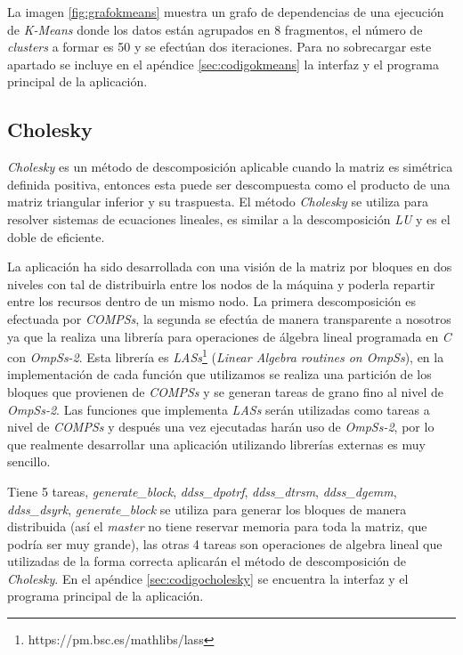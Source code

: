 La imagen \ref{fig:grafokmeans} muestra un grafo de dependencias de una ejecución de \textit{K-Means} donde los datos están agrupados en 8 fragmentos, el número de \textit{clusters} a formar es 50 y se efectúan dos iteraciones. Para no sobrecargar este apartado se incluye en el apéndice \ref{sec:codigokmeans} la interfaz y el programa principal de la aplicación.

\subsection{Cholesky}

\textit{Cholesky} es un método de descomposición aplicable cuando la matriz es simétrica definida positiva, entonces esta puede ser descompuesta como el producto de una matriz triangular inferior y su traspuesta. El método \textit{Cholesky} se utiliza para resolver sistemas de ecuaciones lineales, es similar a la descomposición \textit{LU} y es el doble de eficiente.
\par\bigskip
La aplicación ha sido desarrollada con una visión de la matriz por bloques en dos niveles con tal de distribuirla entre los nodos de la máquina y poderla repartir entre los recursos dentro de un mismo nodo. La primera descomposición es efectuada por \textit{COMPSs}, la segunda se efectúa de manera transparente a nosotros ya que la realiza una librería para operaciones de álgebra lineal programada en \textit{C} con \textit{OmpSs-2}. Esta librería es \textit{LASs}\footnote{https://pm.bsc.es/mathlibs/lass} (\textit{Linear Algebra routines on OmpSs}), en la implementación de cada función que utilizamos se realiza una partición de los bloques que provienen de \textit{COMPSs} y se generan tareas de grano fino al nivel de \textit{OmpSs-2}. Las funciones que implementa \textit{LASs} serán utilizadas como tareas a nivel de \textit{COMPSs} y después una vez ejecutadas harán uso de \textit{OmpSs-2}, por lo que realmente desarrollar una aplicación utilizando librerías externas es muy sencillo.
\par\bigskip
Tiene 5 tareas, \textit{generate\_block}, \textit{ddss\_dpotrf}, \textit{ddss\_dtrsm}, \textit{ddss\_dgemm}, \textit{ddss\_dsyrk}, \textit{generate\_block} se utiliza para generar los bloques de manera distribuida (así el \textit{master} no tiene reservar memoria para toda la matriz, que podría ser muy grande), las otras 4 tareas son operaciones de algebra lineal que utilizadas de la forma correcta aplicarán el método de descomposición de \textit{Cholesky}.
En el apéndice \ref{sec:codigocholesky} se encuentra la interfaz y el programa principal de la aplicación. 

